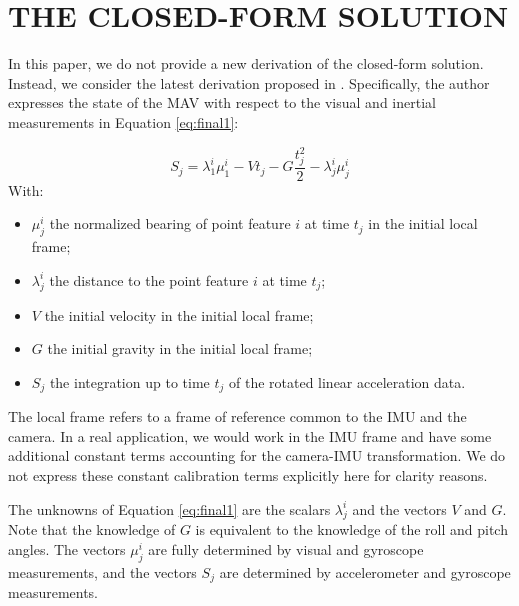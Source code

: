 \documentclass[letterpaper, 10 pt, conference]{ieeeconf}  %
\begin{document}
\section{THE CLOSED-FORM SOLUTION}

In this paper, we do not provide a new derivation of the closed-form solution.
Instead, we consider the latest derivation proposed in \cite{Martinelli2014}.
Specifically, the author expresses the state of the MAV with respect to the visual and inertial measurements in Equation \ref{eq:final1}:


\begin{equation} \tag{6} \label{eq:final1}
S_j = \lambda_1^i\mu_1^i - V t_j - G \frac{t_j^2}{2} - \lambda^i_j \mu^i_j
\end{equation}
With:
\begin{itemize}
\item $\mu_j^i$ the normalized bearing of point feature $i$ at time $t_j$ in the initial local frame;
\item $\lambda_j^i$ the distance to the point feature $i$ at time $t_j$;
\item $V$ the initial velocity in the initial local frame;
\item $G$ the initial gravity in the initial local frame;
\item $S_j$ the integration up to time $t_j$ of the rotated linear acceleration data.
\end{itemize}


The local frame refers to a frame of reference common to the IMU and the camera.
In a real application, we would work in the IMU frame and have some additional constant terms
accounting for the camera-IMU transformation.
We do not express these constant calibration terms explicitly here for clarity reasons.

The unknowns of Equation \ref{eq:final1} are the scalars $\lambda_j^i$ and the vectors $V$ and $G$.
Note that the knowledge of $G$ is equivalent to the knowledge of the roll and pitch angles.
The vectors $\mu_j^i$ are fully determined by visual and gyroscope measurements,
and the vectors $S_j$ are determined by accelerometer and gyroscope measurements.
\end{document}
